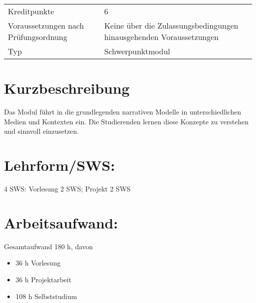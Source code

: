\begin{longtable}[]{@{}ll@{}}
\begin{minipage}[t]{0.12\columnwidth}
Kreditpunkte\strut
\end{minipage} & \begin{minipage}[t]{0.12\columnwidth}\raggedright\strut
6\strut
\end{minipage}\tabularnewline
\begin{minipage}[t]{0.12\columnwidth}\raggedright\strut
Voraussetzungen nach Prüfungsordnung\strut
\end{minipage} & \begin{minipage}[t]{0.12\columnwidth}\raggedright\strut
Keine über die Zulassungsbedingungen hinausgehenden
Voraussetzungen\strut
\end{minipage}\tabularnewline
\begin{minipage}[t]{0.12\columnwidth}\raggedright\strut
Typ\strut
\end{minipage} & \begin{minipage}[t]{0.12\columnwidth}\raggedright\strut
Schwerpunktmodul\strut
\end{minipage}\tabularnewline
\bottomrule
\end{longtable}

\section*{Kurzbeschreibung}\label{kurzbeschreibung-14}

Das Modul führt in die grundlegenden narrativen Modelle in
unterschiedlichen Medien und Kontexten ein. Die Studierenden lernen
diese Konzepte zu verstehen und sinnvoll einzusetzen.

\section*{Lehrform/SWS:}\label{lehrformsws-23}

4 SWS: Vorlesung 2 SWS; Projekt 2 SWS

\section*{Arbeitsaufwand:}\label{arbeitsaufwand-23}

Gesamtaufwand 180 h, davon

\begin{itemize}
\item
  36 h Vorlesung
\item
  36 h Projektarbeit
\item
  108 h Selbststudium
\end{itemize}

